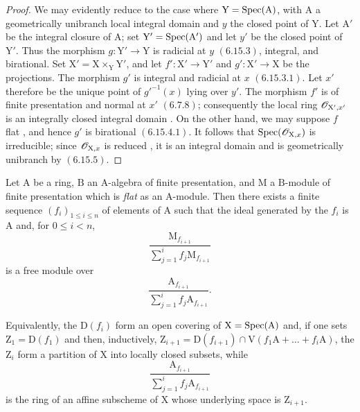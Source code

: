 \begin{proof}
We may evidently reduce to the case where $\mathrm{Y}=\operatorname{Spec}(\mathrm{A})$, with $\mathrm{A}$ a geometrically unibranch local integral domain and $y$ the closed point of $\mathrm{Y}$. Let $\mathrm{A}'$ be the integral closure of $\mathrm{A}$; set $\mathrm{Y}'=\operatorname{Spec}(\mathrm{A}')$ and let $y'$ be the closed point of $\mathrm{Y}'$. Thus the morphism $g:\mathrm{Y}'\to\mathrm{Y}$ is radicial at $y$ $(6.15.3)$, integral, and birational. Set $\mathrm{X}'=\mathrm{X}\times_\mathrm{Y}\mathrm{Y}'$, and let $f':\mathrm{X}'\to\mathrm{Y}'$ and $g':\mathrm{X}'\to\mathrm{X}$ be the projections. The morphism $g'$ is integral and radicial at $x$ $(6.15.3.1)$. Let $x'$ therefore be the unique point of $g'^{-1}(x)$ lying over $y'$. The morphism $f'$ is of finite presentation and normal at $x'$ $(6.7.8)$; consequently the local ring $\mathscr{O}_{\mathrm{X}',x'}$ is an integrally closed integral domain . On the other hand, we may suppose $f$ flat , and hence $g'$ is birational $(6.15.4.1)$. It follows that $\operatorname{Spec}(\mathscr{O}_{\mathrm{X},x})$ is irreducible; since $\mathscr{O}_{\mathrm{X},x}$ is reduced , it is an integral domain and is geometrically unibranch by $(6.15.5)$.
\end{proof}

\begin{proposition}[11.3.15]
\label{IV.11.3.15}
Let $\mathrm{A}$ be a ring, $\mathrm{B}$ an $\mathrm{A}$-algebra of finite presentation, and $\mathrm{M}$ a $\mathrm{B}$-module of finite presentation which is \emph{flat} as an $\mathrm{A}$-module. Then there exists a finite sequence $(f_i)_{1\leqslant i\leqslant n}$ of elements of $\mathrm{A}$ such that the ideal generated by the $f_i$ is $\mathrm{A}$ and, for $0\leqslant i<n$,
\[
  \frac{\mathrm{M}_{f_{i+1}}}
       {\sum_{j=1}^{i}f_j\mathrm{M}_{f_{i+1}}}
\]
is a free module over
\[
  \frac{\mathrm{A}_{f_{i+1}}}
       {\sum_{j=1}^{i}f_j\mathrm{A}_{f_{i+1}}}.
\]
\end{proposition}

Equivalently, the $\mathrm{D}(f_i)$ form an open covering of $\mathrm{X}=\operatorname{Spec}(\mathrm{A})$ and, if one sets $\mathrm{Z}_1=\mathrm{D}(f_1)$ and then, inductively, $\mathrm{Z}_{i+1}
=\mathrm{D}(f_{i+1})
\cap\mathrm{V}(f_1\mathrm{A}+\ldots+f_i\mathrm{A})$,
the $\mathrm{Z}_i$ form a partition of $\mathrm{X}$ into locally closed subsets, while
\[
  \frac{\mathrm{A}_{f_{i+1}}}
       {\sum_{j=1}^{i}f_j\mathrm{A}_{f_{i+1}}}
\]
is the ring of an affine subscheme of $\mathrm{X}$ whose underlying space is $\mathrm{Z}_{i+1}$.

